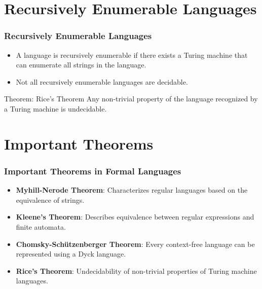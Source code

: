 \documentclass{beamer}
\begin{document}
\section{Recursively Enumerable Languages}
\begin{frame}
    \frametitle{Recursively Enumerable Languages}
    \begin{itemize}
        \item A language is recursively enumerable if there exists a Turing machine that can enumerate all strings in the language.
        \item Not all recursively enumerable languages are decidable.
    \end{itemize}
    \pause
    \begin{block}{Theorem: Rice's Theorem}
        Any non-trivial property of the language recognized by a Turing machine is undecidable.
    \end{block}
\end{frame}

\section{Important Theorems}
\begin{frame}
    \frametitle{Important Theorems in Formal Languages}
    \begin{itemize}
        \item \textbf{Myhill-Nerode Theorem}: Characterizes regular languages based on the equivalence of strings.
        \item \textbf{Kleene's Theorem}: Describes equivalence between regular expressions and finite automata.
        \item \textbf{Chomsky-Schützenberger Theorem}: Every context-free language can be represented using a Dyck language.
        \item \textbf{Rice's Theorem}: Undecidability of non-trivial properties of Turing machine languages.
    \end{itemize}
\end{frame}

  
\end{document}
